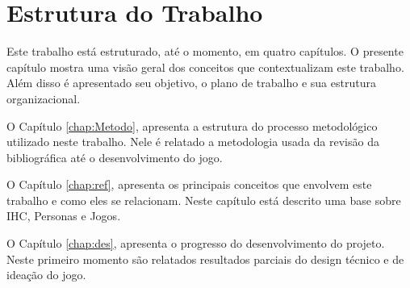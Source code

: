 \section{Estrutura do Trabalho}

Este trabalho está estruturado, até o momento, em quatro capítulos. O presente capítulo mostra uma visão geral dos conceitos que contextualizam este trabalho. Além disso é apresentado seu objetivo, o plano de trabalho e sua estrutura organizacional.

O Capítulo \ref{chap:Metodo}, apresenta a estrutura do processo metodológico utilizado neste trabalho. Nele é relatado a metodologia usada da revisão da bibliográfica até o desenvolvimento do jogo.  

O Capítulo \ref{chap:ref}, apresenta os principais conceitos que envolvem este trabalho e como eles se relacionam. Neste capítulo está descrito uma base sobre IHC, Personas e Jogos.

O Capítulo \ref{chap:des}, apresenta o progresso do desenvolvimento do projeto. Neste primeiro momento são relatados resultados parciais do design técnico e de ideação do jogo.


